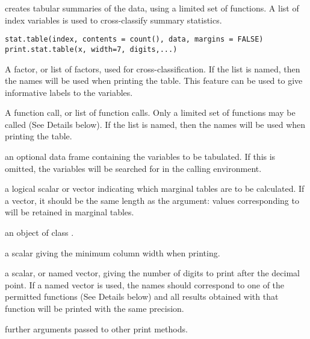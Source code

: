 \begin{Description}\relax
{} creates tabular summaries of the data, using a
limited set of functions. A list of index variables is used
to cross-classify summary statistics.
\end{Description}
\begin{Usage}
\begin{verbatim}
stat.table(index, contents = count(), data, margins = FALSE)
print.stat.table(x, width=7, digits,...)
\end{verbatim}
\end{Usage}
\begin{Arguments}
\begin{ldescription}
\item[\code{index}] A factor, or list of factors, used for cross-classification.
If the list is named, then the names will be used when printing the
table. This feature can be used to give informative labels to the
variables.
\item[\code{contents}] A function call, or list of function calls. Only a
limited set of functions may be called (See Details below).  If the
list is named, then the names will be used when printing the table.
\item[\code{data}] an optional data frame containing the variables to be
tabulated. If this is omitted, the variables will be searched for in the
calling environment.
\item[\code{margins}] a logical scalar or vector indicating which  marginal
tables are to be calculated.  If a vector, it should be the same
length as the  argument: values corresponding to
 will be retained in marginal tables.
\item[\code{x}] an object of class .
\item[\code{width}] a scalar giving the minimum column width when printing.
\item[\code{digits}] a scalar, or named vector, giving the number
of digits to print after the decimal point. If a named vector is used,
the names should correspond to one of the permitted functions (See
Details below) and all results obtained with that function will be
printed with the same precision.
\item[\code{...}] further arguments passed to other print methods.
\end{ldescription}
\end{Arguments}
